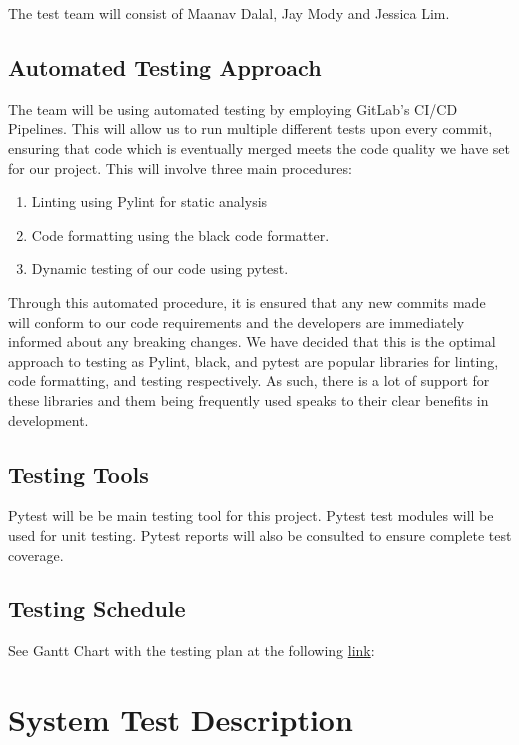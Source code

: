 \documentclass[12pt, titlepage]{article}
\begin{document}
The test team will consist of Maanav Dalal, Jay Mody and Jessica Lim.

\subsection{Automated Testing Approach}
The team will be using automated testing by employing GitLab's CI/CD Pipelines. This will allow us to run multiple different tests upon every commit, ensuring that code which is eventually merged meets the code quality we have set for our project. This will involve three main procedures:
\begin{enumerate}
    \item Linting using Pylint for static analysis
    \item Code formatting using the black code formatter.
    \item Dynamic testing of our code using pytest.
\end{enumerate}

Through this automated procedure, it is ensured that any new commits made will conform to our code requirements and the developers are immediately informed about any breaking changes. We have decided that this is the optimal approach to testing as Pylint, black, and pytest are popular libraries for linting, code formatting, and testing respectively. As such, there is a lot of support for these libraries and them being frequently used speaks to their clear benefits in development.
\subsection{Testing Tools}

Pytest will be be main testing tool for this project. Pytest test modules will be used for unit testing. Pytest reports will also be consulted to ensure complete test coverage.

\subsection{Testing Schedule}

See Gantt Chart with the testing plan at the following \href{https://gitlab.cas.mcmaster.ca/modyj/3xa3/-/tree/master/ProjectSchedule}{link}:

\section{System Test Description}
\end{document}
